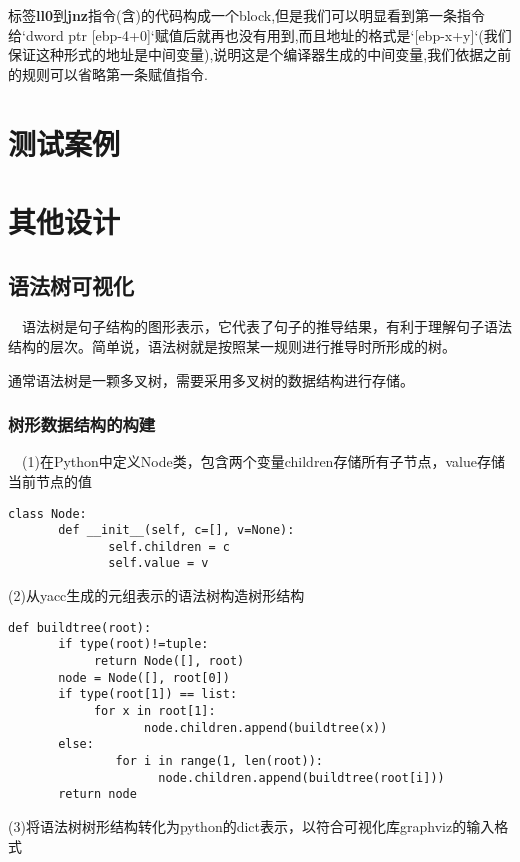 \documentclass{article}
\begin{document}
标签\textbf{ll0}到\textbf{jnz}指令(含)的代码构成一个block,但是我们可以明显看到第一条指令给`dword ptr [ebp-4+0]`赋值后就再也没有用到,而且地址的格式是`[ebp-x+y]`(我们保证这种形式的地址是中间变量),说明这是个编译器生成的中间变量,我们依据之前的规则可以省略第一条赋值指令.



\section{测试案例}

\section{其他设计}

\subsection{语法树可视化}
\quad \ \ 语法树是句子结构的图形表示，它代表了句子的推导结果，有利于理解句子语法结构的层次。简单说，语法树就是按照某一规则进行推导时所形成的树。


通常语法树是一颗多叉树，需要采用多叉树的数据结构进行存储。

\subsubsection{树形数据结构的构建}

\quad \ \ (1)在Python中定义Node类，包含两个变量children存储所有子节点，value存储当前节点的值

\begin{verbatim}
class Node:
       def __init__(self, c=[], v=None):
              self.children = c
              self.value = v
\end{verbatim}

(2)从yacc生成的元组表示的语法树构造树形结构

\begin{verbatim}
def buildtree(root):
       if type(root)!=tuple:
            return Node([], root)
       node = Node([], root[0])
       if type(root[1]) == list:
            for x in root[1]:
                   node.children.append(buildtree(x))
       else:
               for i in range(1, len(root)):
                     node.children.append(buildtree(root[i]))
       return node
\end{verbatim}

(3)将语法树树形结构转化为python的dict表示，以符合可视化库graphviz的输入格式
\end{document}
